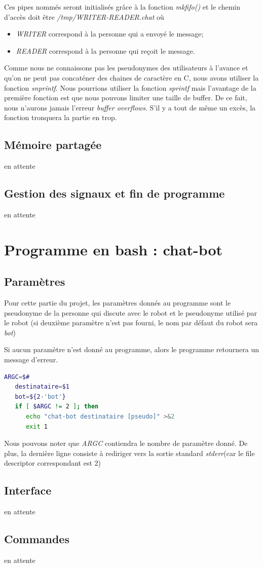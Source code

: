 \documentclass[utf8]{article}
\begin{document}
Ces pipes nommés seront initialisés grâce à la fonction \textit{mkfifo()} et le chemin d'accès doit être \textit{/tmp/WRITER-READER.chat} où
\begin{itemize}
   \item \textit{WRITER} correspond à la personne qui a envoyé le message;
   \item \textit{READER} correspond à la personne qui reçoit le message.
\end{itemize}

Comme nous ne connaissons pas les pseudonymes des utilisateurs à l'avance et qu'on ne peut pas concaténer des chaines de caractère en C, nous avons utiliser la fonction
\textit{snprintf}. Nous pourrions utiliser la fonction \textit{sprintf} mais l'avantage de la première fonction est que nous pouvons limiter une taille de buffer. De ce fait, nous n'aurons jamais l'erreur \textit{buffer overflows}. S'il y a tout de même un excès, la fonction tronquera la partie en trop.


\subsection{Mémoire partagée}
en attente
\subsection{Gestion des signaux et fin de programme}
en attente


\section{Programme en bash : chat-bot}
\subsection{Paramètres}
Pour cette partie du projet, les paramètres donnés au programme sont le pseudonyme de la personne qui discute avec le robot et le pseudonyme utilisé par le robot (si deuxième paramètre n'est pas fourni, le nom par défaut du robot sera \textit{bot})

Si aucun paramètre n'est donné au programme, alors le programme retournera un message d'erreur. 
\begin{lstlisting}[language=bash, caption={Gestion de paramètre}]
   ARGC=$#
   destinataire=$1
   bot=${2-'bot'}
   if [ $ARGC != 2 ]; then
      echo "chat-bot destinataire [pseudo]" >&2 
      exit 1
\end{lstlisting}
Nous pouvons noter que \textit{ARGC} contiendra le nombre de paramètre donné. De plus, la dernière ligne consiste à rediriger vers la sortie standard \textit{stderr}(car le file descriptor correspondant est 2)

\subsection{Interface}
en attente
\subsection{Commandes}
en attente
\end{document}
